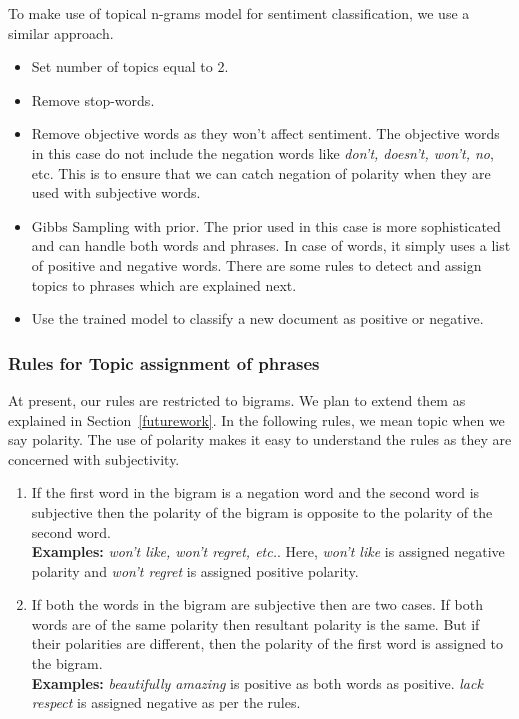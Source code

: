 \documentclass[11pt]{article}
\begin{document}
To make use of topical n-grams model for sentiment classification, we use a similar approach.

\begin{itemize}
 \itemsep0em
 \item Set number of topics equal to 2.
 \item Remove stop-words.
 \item Remove objective words as they won't affect sentiment. The objective words in this
 case do not include the negation words like \textit{don't, doesn't, won't, no}, etc. This is to
 ensure that we can catch negation of polarity when they are used with subjective words.
 \item Gibbs Sampling with prior. The prior used in this case is more sophisticated and can
 handle both words and phrases. In case of words, it simply uses a list of positive and negative
 words. There are some rules to detect and assign topics to phrases which are explained next.
 \item Use the trained model to classify a new document as positive or negative.
\end{itemize}

\subsubsection*{Rules for Topic assignment of phrases}

At present, our rules are restricted to bigrams. We plan to extend them as explained in Section~\ref{futurework}.
In the following rules, we mean topic when we say polarity. The use of polarity makes it easy to understand
the rules as they are concerned with subjectivity.

\begin{enumerate}
 \itemsep0em
 \item If the first word in the bigram is a negation word and the second word is subjective then the polarity
 of the bigram is opposite to the polarity of the second word. \\
 \textbf{Examples:} \textit{won't like, won't regret, etc.}. Here, \textit{won't like} is assigned negative
 polarity and \textit{won't regret} is assigned positive polarity.
 \item If both the words in the bigram are subjective then are two cases. If both words are of the same polarity
 then resultant polarity is the same. But if their polarities are different, then the polarity of the first word
 is assigned to the bigram. \\
 \textbf{Examples:} \textit{beautifully amazing} is positive as both words as positive. \textit{lack respect} is
 assigned negative as per the rules.
\end{enumerate}
\end{document}

